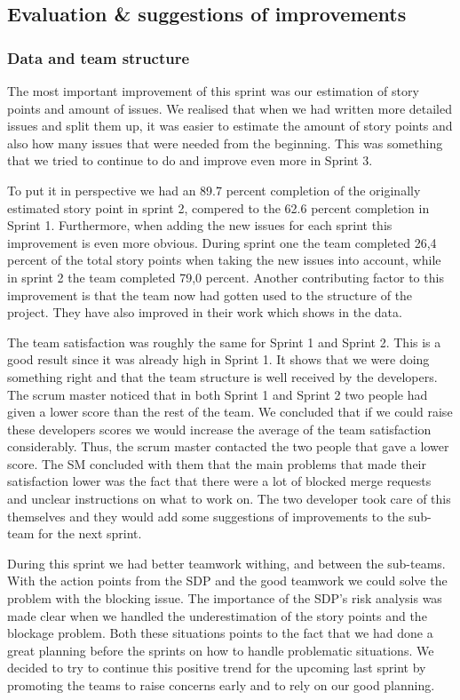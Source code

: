 \documentclass{article}
\begin{document}
\subsection{Evaluation \& suggestions of improvements} 

\subsubsection{Data and team structure}
The most important improvement of this sprint was our estimation of story points and amount of issues. We realised that when we had written more detailed issues and split them up, it was easier to estimate the amount of story points and also how many issues that were needed from the beginning. This was something that we tried to continue to do and improve even more in Sprint 3. 

To put it in perspective we had an 89.7 percent completion of the originally estimated story point in sprint 2, compered to the 62.6 percent completion in Sprint 1. Furthermore, when adding the new issues for each sprint this improvement is even more obvious. During sprint one the team completed 26,4 percent of the total story points when taking the new issues into account, while in sprint 2 the team completed 79,0 percent. Another contributing factor to this improvement is that the team now had gotten used to the structure of the project. They have also improved in their work which shows in the data. 

The team satisfaction was roughly the same for Sprint 1 and Sprint 2. This is a good result since it was already high in Sprint 1. It shows that we were doing something right and that the team structure is well received by the developers. The scrum master noticed that in both Sprint 1 and Sprint 2 two people had given a lower score than the rest of the team. We concluded that if we could raise these developers scores we would increase the average of the team satisfaction considerably. Thus, the scrum master contacted the two people that gave a lower score. The SM concluded with them that the main problems that made their satisfaction lower was the fact that there were a lot of blocked merge requests and unclear instructions on what to work on. The two developer took care of this themselves and they would add some suggestions of improvements to the sub-team for the next sprint.

During this sprint we had better teamwork withing, and between the sub-teams. With the action points from the SDP and the good teamwork we could solve the problem with the blocking issue. The importance of the SDP's risk analysis was made clear when we handled the underestimation of the story points and the blockage problem. Both these situations points to the fact that we had done a great planning before the sprints on how to handle problematic situations. We decided to try to continue this positive trend for the upcoming last sprint by promoting the teams to raise concerns early and to rely on our good planning.
\end{document}
